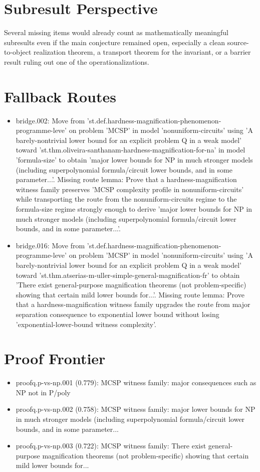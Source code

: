 \documentclass[11pt]{article}
\begin{document}
\section{Subresult Perspective}
Several missing items would already count as mathematically meaningful subresults even if the main conjecture remained open, especially a clean source-to-object realization theorem, a transport theorem for the invariant, or a barrier result ruling out one of the operationalizations.

\section{Fallback Routes}
\begin{itemize}[leftmargin=*,itemsep=0.2em]
\item bridge.002: Move from 'st.def.hardness-magnification-phenomenon-programme-leve' on problem 'MCSP' in model 'nonuniform-circuits' using 'A barely-nontrivial lower bound for an explicit problem Q in a weak model' toward 'st.thm.oliveira-santhanam-hardness-magnification-for-na' in model 'formula-size' to obtain 'major lower bounds for NP in much stronger models (including superpolynomial formula/circuit lower bounds, and in some parameter...'. Missing route lemma: Prove that a hardness-magnification witness family preserves 'MCSP complexity profile in nonuniform-circuits' while transporting the route from the nonuniform-circuits regime to the formula-size regime strongly enough to derive 'major lower bounds for NP in much stronger models (including superpolynomial formula/circuit lower bounds, and in some parameter...'.
\item bridge.016: Move from 'st.def.hardness-magnification-phenomenon-programme-leve' on problem 'MCSP' in model 'nonuniform-circuits' using 'A barely-nontrivial lower bound for an explicit problem Q in a weak model' toward 'st.thm.atserias-m-uller-simple-general-magnification-fr' to obtain 'There exist general-purpose magnification theorems (not problem-specific) showing that certain mild lower bounds for...'. Missing route lemma: Prove that a hardness-magnification witness family upgrades the route from major separation consequence to exponential lower bound without losing 'exponential-lower-bound witness complexity'.
\end{itemize}

\section{Proof Frontier}
\begin{itemize}[leftmargin=*,itemsep=0.2em]
\item proofq.p-vs-np.001 (0.779): MCSP witness family: major consequences such as NP not in P/poly
\item proofq.p-vs-np.002 (0.758): MCSP witness family: major lower bounds for NP in much stronger models (including superpolynomial formula/circuit lower bounds, and in some parameter...
\item proofq.p-vs-np.003 (0.722): MCSP witness family: There exist general-purpose magnification theorems (not problem-specific) showing that certain mild lower bounds for...
\end{itemize}
\end{document}
